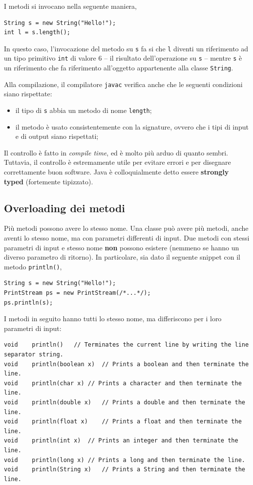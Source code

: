 \documentclass[\fontsizeclass,twocolumn]{\classname}
\theoremstyle{definition}
\theoremstyle{definition}
\begin{document}
I metodi si invocano nella seguente maniera,

\begin{lstlisting}
String s = new String("Hello!");
int l = s.length();
\end{lstlisting}

In questo caso, l'invocazione del metodo su \texttt{s} fa si che \texttt{l}
diventi un riferimento ad un tipo primitivo \texttt{int} di valore 6 \--- il
risultato dell'operazione su \texttt{s} \--- mentre \texttt{s} è un riferimento
che fa riferimento all'oggetto appartenente alla classe \texttt{String}.

Alla compilazione, il compilatore \texttt{javac} verifica anche che le seguenti
condizioni siano rispettate:
\begin{itemize}
	\item il tipo di \texttt{s} abbia un metodo di nome \texttt{length};
	\item il metodo è usato consistentemente con la signature, ovvero che i
		tipi di input e di output siano rispettati;
\end{itemize}

Il controllo è fatto in \emph{compile time}, ed è molto più arduo di quanto
sembri. Tuttavia, il controllo è estremamente utile per evitare errori e per
disegnare correttamente buon software. Java è colloquialmente detto essere
\textbf{strongly typed} (fortemente tipizzato).

\subsection{Overloading dei metodi}

Più metodi possono avere lo stesso nome. Una classe può avere più metodi, anche
aventi lo stesso nome, ma con parametri differenti di input. Due metodi con
stessi parametri di input e stesso nome \textbf{non} possono esistere (nemmeno
se hanno un diverso parametro di ritorno). In particolare, sia dato il seguente
snippet con il metodo \texttt{println()},

\begin{lstlisting}
String s = new String("Hello!");
PrintStream ps = new PrintStream(/*...*/);
ps.println(s);
\end{lstlisting}

I metodi in seguito hanno tutti lo stesso nome, ma differiscono per i loro
parametri di input:

\begin{lstlisting}
void	println()	// Terminates the current line by writing the line separator string.
void	println(boolean x)	// Prints a boolean and then terminate the line.
void	println(char x)	// Prints a character and then terminate the line.
void	println(double x)	// Prints a double and then terminate the line.
void	println(float x)	// Prints a float and then terminate the line.
void	println(int x)	// Prints an integer and then terminate the line.
void	println(long x)	// Prints a long and then terminate the line.
void	println(String x)	// Prints a String and then terminate the line.
\end{lstlisting}
\end{document}
